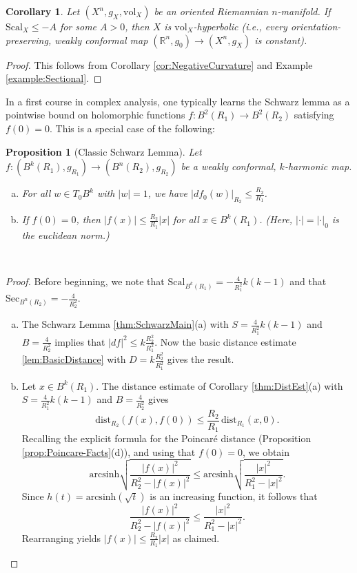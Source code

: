 \documentclass[11pt]{article}
\newcommand{\R}{\mathbb{R}}
\newcommand{\vol}{\mathrm{vol}}
\newtheorem{prop}[thm]{Proposition}
\newtheorem{cor}[thm]{Corollary}
\theoremstyle{definition}
\numberwithin{equation}{section}
\begin{document}
\begin{cor} \label{cor:Vol-Hyperbolic} Let $(X^n, g_X, \vol_X)$ be an oriented Riemannian $n$-manifold.  If $\mathrm{Scal}_X \leq -A$ for some $A > 0$, then $X$ is $\vol_X$-hyperbolic (i.e., every orientation-preserving, weakly conformal map $(\R^n, g_0) \to (X^n, g_X)$ is constant).
\end{cor}

\begin{proof} This follows from Corollary \ref{cor:NegativeCurvature} and Example \ref{example:Sectional}.
\end{proof}

\indent In a first course in complex analysis, one typically learns the Schwarz lemma as a pointwise bound on holomorphic functions $f \colon B^2(R_1) \to B^2(R_2)$ satisfying $f(0) = 0$.  This is a special case of the following:

\begin{prop}[Classic Schwarz Lemma] \label{thm:ClassicSchwarz} Let $f \colon (B^k(R_1), g_{R_1}) \to (B^n(R_2), g_{R_2})$ be a weakly conformal, $k$-harmonic map.
\begin{enumerate}[(a)]
\item For all $w \in T_0B^k$ with $|w| = 1$, we have $|df_0(w)|_{R_2} \leq \frac{R_2}{R_1}$.
\item If $f(0) = 0$, then $\left| f(x) \right| \leq \frac{R_2}{R_1} |x|$ for all $x \in B^k(R_1)$.  (Here, $|\cdot| = |\cdot|_0$ is the euclidean norm.)
\end{enumerate}
\end{prop}
${}$
\begin{proof} Before beginning, we note that $\mathrm{Scal}_{B^k(R_1)} = -\frac{4}{R_1^2}k(k-1)$ and that $\mathrm{Sec}_{B^n(R_2)} = -\frac{4}{R_2^2}$.
\begin{enumerate}[(a)]
\item The Schwarz Lemma \ref{thm:SchwarzMain}(a) with $S = \frac{4}{R_1^2}k(k-1)$ and $B = \frac{4}{R_2^2}$ implies that $|df|^2 \leq k\frac{R_2^2}{R_1^2}$.  Now the basic distance estimate \ref{lem:BasicDistance} with $D = k\frac{R_2^2}{R_1^2}$ gives the result.
\item Let $x \in B^k(R_1)$.  The distance estimate of Corollary \ref{thm:DistEst}(a) with  $S = \frac{4}{R_1^2}k(k-1)$ and $B = \frac{4}{R_2^2}$ gives
$$\mathrm{dist}_{R_2}(f(x), f(0)) \leq \frac{R_2}{R_1}\,\mathrm{dist}_{R_1}(x,0).$$
Recalling the explicit formula for the Poincar\'{e} distance (Proposition \ref{prop:Poincare-Facts}(d)), and using that $f(0) = 0$, we obtain
$$\mathrm{arcsinh}\sqrt{ \frac{  | f(x) |^2 }{ R_2^2 - |f(x)|^2  } } \leq   \mathrm{arcsinh}\sqrt{ \frac{  | x |^2 }{ R_1^2 - |x|^2  } } .$$
Since $h(t) = \mathrm{arcsinh} (\sqrt{t})$ is an increasing function, it follows that
$$ \frac{  | f(x) |^2 }{ R_2^2 - |f(x)|^2  }  \leq    \frac{  | x |^2 }{ R_1^2 - |x|^2  }.$$
Rearranging yields $|f(x)| \leq \frac{R_2}{R_1}|x|$ as claimed.
\end{enumerate}
\end{proof}
\end{document}
